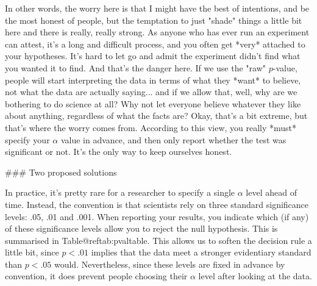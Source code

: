 In other words, the worry here is that I might have the best of intentions, and be the most honest of people, but the temptation to just "shade" things a little bit here and there is really, really strong. As anyone who has ever run an experiment can attest, it's a long and difficult process, and you often get *very* attached to your hypotheses. It's hard to let go and admit the experiment didn't find what you wanted it to find. And that's the danger here. If we use the "raw" $p$-value, people will start interpreting the data in terms of what they *want* to believe, not what the data are actually saying... and if we allow that, well, why are we bothering to do science at all? Why not let everyone believe whatever they like about anything, regardless of what the facts are? Okay, that's a bit extreme, but that's where the worry comes from. According to this view, you really *must* specify your $\alpha$ value in advance, and then only report whether the test was significant or not. It's the only way to keep ourselves honest. 


### Two proposed solutions

In practice, it's pretty rare for a researcher to specify a single $\alpha$ level ahead of time. Instead, the convention is that scientists rely on three standard significance levels: .05, .01 and .001. When reporting your results, you indicate which (if any) of these significance levels allow you to reject the null hypothesis. This is summarised in Table@reftab:pvaltable. This allows us to soften the decision rule a little bit, since $p<.01$ implies that the data meet a stronger evidentiary standard than $p<.05$ would. Nevertheless, since these levels are fixed in advance by convention, it does prevent people choosing their $\alpha$ level after looking at the data. 


